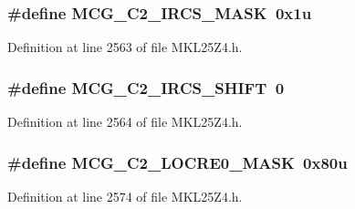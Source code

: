 \subsubsection[{\texorpdfstring{M\+C\+G\+\_\+\+C2\+\_\+\+I\+R\+C\+S\+\_\+\+M\+A\+SK}{MCG_C2_IRCS_MASK}}]{\setlength{\rightskip}{0pt plus 5cm}\#define M\+C\+G\+\_\+\+C2\+\_\+\+I\+R\+C\+S\+\_\+\+M\+A\+SK~0x1u}\hypertarget{group___m_c_g___register___masks_gaef3ef9fc35df3b7d404dd2b7279051cb}{}\label{group___m_c_g___register___masks_gaef3ef9fc35df3b7d404dd2b7279051cb}


Definition at line 2563 of file M\+K\+L25\+Z4.\+h.

\subsubsection[{\texorpdfstring{M\+C\+G\+\_\+\+C2\+\_\+\+I\+R\+C\+S\+\_\+\+S\+H\+I\+FT}{MCG_C2_IRCS_SHIFT}}]{\setlength{\rightskip}{0pt plus 5cm}\#define M\+C\+G\+\_\+\+C2\+\_\+\+I\+R\+C\+S\+\_\+\+S\+H\+I\+FT~0}\hypertarget{group___m_c_g___register___masks_ga9a364696151f81b7a671bafd25cf16d1}{}\label{group___m_c_g___register___masks_ga9a364696151f81b7a671bafd25cf16d1}


Definition at line 2564 of file M\+K\+L25\+Z4.\+h.

\subsubsection[{\texorpdfstring{M\+C\+G\+\_\+\+C2\+\_\+\+L\+O\+C\+R\+E0\+\_\+\+M\+A\+SK}{MCG_C2_LOCRE0_MASK}}]{\setlength{\rightskip}{0pt plus 5cm}\#define M\+C\+G\+\_\+\+C2\+\_\+\+L\+O\+C\+R\+E0\+\_\+\+M\+A\+SK~0x80u}\hypertarget{group___m_c_g___register___masks_gae89f2e48b02a39563115d1a60dc8f16f}{}\label{group___m_c_g___register___masks_gae89f2e48b02a39563115d1a60dc8f16f}


Definition at line 2574 of file M\+K\+L25\+Z4.\+h.

